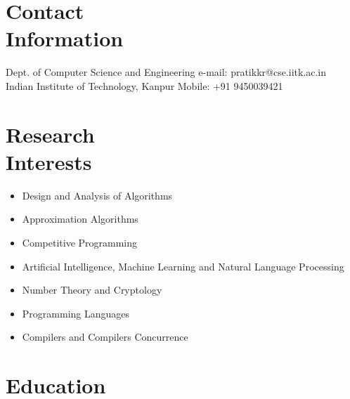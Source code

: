 \documentclass[margin,line]{resume}
\begin{document}
\begin{resume}

  \section{\mysidestyle Contact\\Information}

  Dept. of Computer Science and Engineering                            \hfill e-mail: pratikkr@cse.iitk.ac.in  \vspace{0mm}\\\vspace{0mm}%
  Indian Institute of Technology, Kanpur                         \hfill Mobile: +91 9450039421 \vspace{0mm}\       \vspace{0mm}\\\vspace{-4.5mm}%


  \section{\mysidestyle Research\\Interests}

  \begin{itemize}\itemsep0pt
  \item Design and Analysis of Algorithms
  \item Approximation Algorithms
  \item Competitive Programming
  \item Artificial Intelligence, Machine Learning and Natural Language Processing
  \item Number Theory and Cryptology
  \item Programming Languages
  \item Compilers and Compilers Concurrence
  \end{itemize}


  \section{\mysidestyle Education}


\end{resume}
\end{document}
